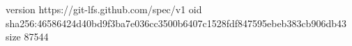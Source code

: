 version https://git-lfs.github.com/spec/v1
oid sha256:46586424d40bd9f3ba7e036cc3500b6407c1528fdf847595ebeb383cb906db43
size 87544
